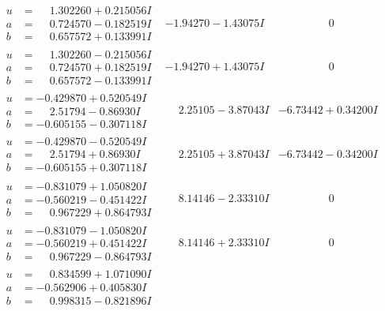 \documentclass[1p]{elsarticle_modified}
\theoremstyle{definition}
\begin{document}
$$\begin{array}{c|c|c}
\begin{aligned}
u &= \phantom{-}1.302260 + 0.215056 I \\
a &= \phantom{-}0.724570 - 0.182519 I \\
b &= \phantom{-}0.657572 + 0.133991 I\end{aligned}
 & -1.94270 - 1.43075 I & \phantom{-0.000000 } 0 \\ \hline\begin{aligned}
u &= \phantom{-}1.302260 - 0.215056 I \\
a &= \phantom{-}0.724570 + 0.182519 I \\
b &= \phantom{-}0.657572 - 0.133991 I\end{aligned}
 & -1.94270 + 1.43075 I & \phantom{-0.000000 } 0 \\ \hline\begin{aligned}
u &= -0.429870 + 0.520549 I \\
a &= \phantom{-}2.51794 - 0.86930 I \\
b &= -0.605155 - 0.307118 I\end{aligned}
 & \phantom{-}2.25105 - 3.87043 I & -6.73442 + 0.34200 I \\ \hline\begin{aligned}
u &= -0.429870 - 0.520549 I \\
a &= \phantom{-}2.51794 + 0.86930 I \\
b &= -0.605155 + 0.307118 I\end{aligned}
 & \phantom{-}2.25105 + 3.87043 I & -6.73442 - 0.34200 I \\ \hline\begin{aligned}
u &= -0.831079 + 1.050820 I \\
a &= -0.560219 - 0.451422 I \\
b &= \phantom{-}0.967229 + 0.864793 I\end{aligned}
 & \phantom{-}8.14146 - 2.33310 I & \phantom{-0.000000 } 0 \\ \hline\begin{aligned}
u &= -0.831079 - 1.050820 I \\
a &= -0.560219 + 0.451422 I \\
b &= \phantom{-}0.967229 - 0.864793 I\end{aligned}
 & \phantom{-}8.14146 + 2.33310 I & \phantom{-0.000000 } 0 \\ \hline\begin{aligned}
u &= \phantom{-}0.834599 + 1.071090 I \\
a &= -0.562906 + 0.405830 I \\
b &= \phantom{-}0.998315 - 0.821896 I\end{aligned}

\end{array}$$
\end{document}
